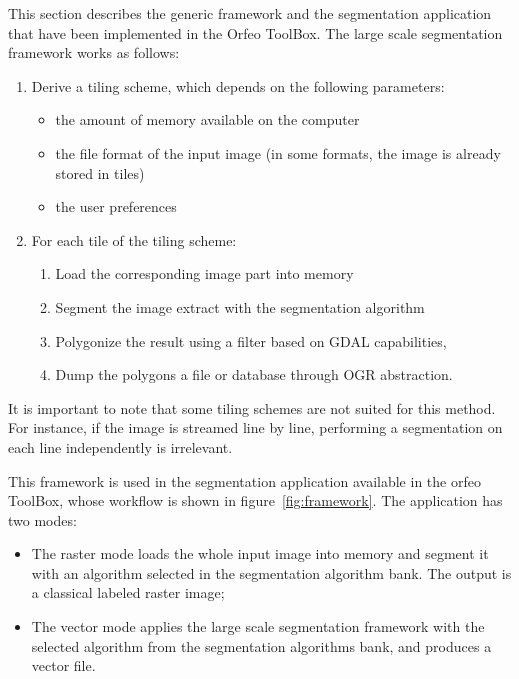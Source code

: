 \documentclass{josis}
\begin{document}
This section describes the generic framework and the segmentation
application that have been implemented in the Orfeo ToolBox. The large
scale segmentation framework works as follows:
\begin{enumerate}[1 - ]
\item Derive a tiling scheme, which depends on the following
  parameters:
\begin{itemize}
\item the amount of memory available on the computer
\item the file format of the input image (in some formats,
the image is already stored in tiles)
\item the user preferences
\end{itemize}
\item For each tile of the tiling scheme:
\begin{enumerate}[a - ]
\item Load the corresponding image part into memory
\item Segment the image extract with the segmentation algorithm
\item Polygonize the result using a filter based on GDAL capabilities,
\item Dump the polygons a file or database through OGR
      abstraction.
\end{enumerate}
\end{enumerate}

It is important to note that some tiling schemes are not suited for
this method. For instance, if the image is streamed line by line,
performing a segmentation on each line independently is irrelevant.

This framework is used in the segmentation application available in
the orfeo ToolBox, whose workflow is shown in
figure~\ref{fig:framework}. The application has two modes:
\begin{itemize}
\item The raster
mode loads the whole input image into memory and segment it with an
algorithm selected in the segmentation algorithm bank. The output is a
classical labeled raster image; 
\item The vector mode applies the large
scale segmentation framework with the selected algorithm from the
segmentation algorithms bank, and produces a vector file.
\end{itemize}
\end{document}
